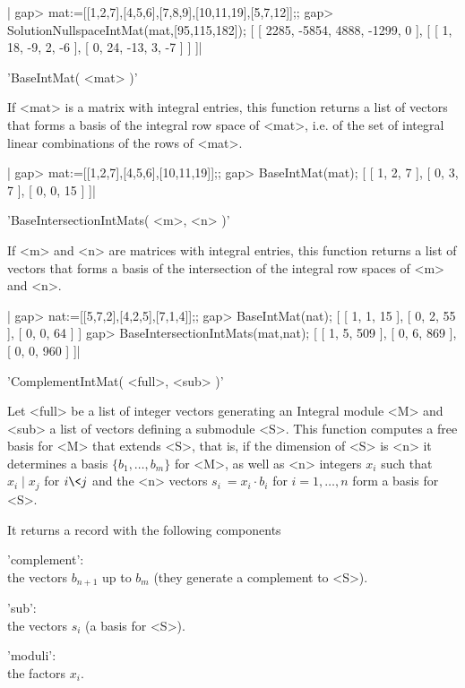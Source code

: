 |    gap> mat:=[[1,2,7],[4,5,6],[7,8,9],[10,11,19],[5,7,12]];;
    gap> SolutionNullspaceIntMat(mat,[95,115,182]);
    [ [ 2285, -5854, 4888, -1299, 0 ],
      [ [ 1, 18, -9, 2, -6 ], [ 0, 24, -13, 3, -7 ] ] ]|

'BaseIntMat( <mat> )'

If <mat> is a matrix with integral entries, this function returns a list of
vectors  that forms a basis of the integral row space of <mat>, i.e. of the
set of integral linear combinations of the rows of <mat>.

|    gap> mat:=[[1,2,7],[4,5,6],[10,11,19]];;
    gap> BaseIntMat(mat);
    [ [ 1, 2, 7 ], [ 0, 3, 7 ], [ 0, 0, 15 ] ]|

'BaseIntersectionIntMats( <m>, <n> )'

If  <m> and <n> are matrices with integral entries, this function returns a
list  of vectors that forms a basis of the intersection of the integral row
spaces of <m> and <n>.

|    gap> nat:=[[5,7,2],[4,2,5],[7,1,4]];;
    gap> BaseIntMat(nat);
    [ [ 1, 1, 15 ], [ 0, 2, 55 ], [ 0, 0, 64 ] ]
    gap> BaseIntersectionIntMats(mat,nat);
    [ [ 1, 5, 509 ], [ 0, 6, 869 ], [ 0, 0, 960 ] ]|

'ComplementIntMat( <full>, <sub> )'

Let  <full> be a list of integer  vectors generating an Integral module <M>
and  <sub>  a  list  of  vectors  defining  a  submodule <S>. This function
computes  a free basis for <M> that  extends <S>, that is, if the dimension
of  <S> is <n> it determines a  basis $\{b_1,\ldots,b_m\}$ for <M>, as well
as  <n> integers  $x_i$ such  that $x_i\mid  x_j$ for  $i\< j$  and the <n>
vectors $s_i\:=x_i\cdot b_i$ for $i=1,\ldots,n$ form a basis for <S>.

It returns a record with the following components\:

'complement':\\
   the vectors $b_{n+1}$ up to $b_m$ (they generate a complement to <S>).

'sub':\\
   the vectors $s_i$ (a basis for <S>).

'moduli':\\
   the factors $x_i$.

